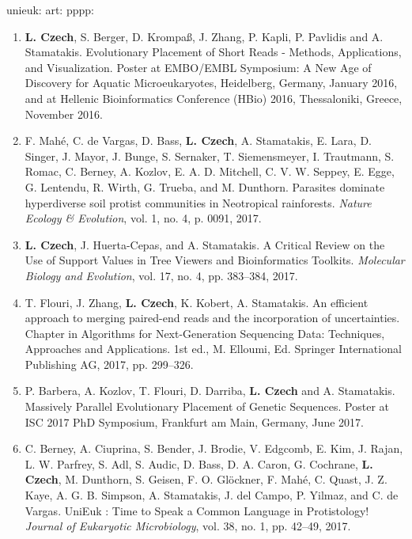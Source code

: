 unieuk: \cite{Berney2017}
art: \cite{Czech2018}
pppp: \cite{Czech2018a}

\begin{enumerate}
    \item \textbf{L. Czech}, S. Berger, D. Krompaß, J. Zhang, P. Kapli, P. Pavlidis and A. Stamatakis.
        Evolutionary Placement of Short Reads - Methods, Applications, and Visualization.
        Poster at EMBO/EMBL Symposium: A New Age of Discovery for Aquatic Microeukaryotes, Heidelberg, Germany, January 2016,
        and at Hellenic Bioinformatics Conference (HBio) 2016, Thessaloniki, Greece, November 2016.

    \item F. Mahé, C. de Vargas, D. Bass, \textbf{L. Czech}, A. Stamatakis, E. Lara, D. Singer, J. Mayor, J. Bunge,
        S. Sernaker, T. Siemensmeyer, I. Trautmann, S. Romac, C. Berney, A. Kozlov, E. A. D. Mitchell, C. V. W. Seppey,
        E. Egge, G. Lentendu, R. Wirth, G. Trueba, and M. Dunthorn.
        Parasites dominate hyperdiverse soil protist communities in Neotropical rainforests.
        \textit{Nature Ecology \& Evolution}, vol. 1, no. 4, p. 0091, 2017.

    \item \textbf{L. Czech}, J. Huerta-Cepas, and A. Stamatakis.
        A Critical Review on the Use of Support Values in Tree Viewers and Bioinformatics Toolkits.
        \textit{Molecular Biology and Evolution}, vol. 17, no. 4, pp. 383–384, 2017.

    \item T. Flouri, J. Zhang, \textbf{L. Czech}, K. Kobert, A. Stamatakis.
        An efficient approach to merging paired-end reads and the incorporation of uncertainties.
        Chapter in Algorithms for Next-Generation Sequencing Data: Techniques, Approaches and Applications.
        1st ed., M. Elloumi, Ed. Springer International Publishing AG, 2017, pp. 299–326.

    \item P. Barbera, A. Kozlov, T. Flouri, D. Darriba, \textbf{L. Czech} and A. Stamatakis.
        Massively Parallel Evolutionary Placement of Genetic Sequences.
        Poster at ISC 2017 PhD Symposium, Frankfurt am Main, Germany, June 2017.

    \item C. Berney, A. Ciuprina, S. Bender, J. Brodie, V. Edgcomb, E. Kim, J. Rajan, L. W. Parfrey, S. Adl, S. Audic,
        D. Bass, D. A. Caron, G. Cochrane, \textbf{L. Czech}, M. Dunthorn, S. Geisen, F. O. Glöckner, F. Mahé, C. Quast,
        J. Z. Kaye, A. G. B. Simpson, A. Stamatakis, J. del Campo, P. Yilmaz, and C. de Vargas.
        UniEuk : Time to Speak a Common Language in Protistology!
        \textit{Journal of Eukaryotic Microbiology}, vol. 38, no. 1, pp. 42–49, 2017.


\end{enumerate}
